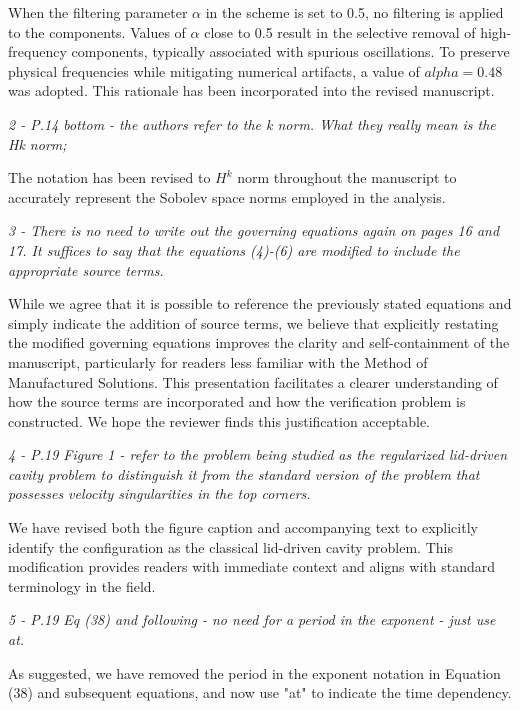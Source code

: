 \documentclass[12pt]{article}
\begin{document}
\vspace{3mm}
When the filtering parameter $\alpha$ in the scheme is set to 0.5, no filtering is applied to the components. Values of $\alpha$ close to 0.5 result in the selective removal of high-frequency components, typically associated with spurious oscillations. To preserve physical frequencies while mitigating numerical artifacts, a value of $alpha = 0.48$ was adopted. This rationale has been incorporated into the revised manuscript.
\vspace{3mm}

{\it 2 - P.14 bottom - the authors refer to the k norm. What they really mean is the Hk norm;}

\vspace{3mm}
The notation has been revised to $H^k$ norm throughout the manuscript to accurately represent the Sobolev space norms employed in the analysis.
\vspace{3mm}

{\it 3 - There is no need to write out the governing equations again on pages 16 and 17. It suffices to say that the equations (4)-(6) are modified to include the appropriate source terms.}

\vspace{3mm}
While we agree that it is possible to reference the previously stated equations and simply indicate the addition of source terms, we believe that explicitly restating the modified governing equations improves the clarity and self-containment of the manuscript, particularly for readers less familiar with the Method of Manufactured Solutions. This presentation facilitates a clearer understanding of how the source terms are incorporated and how the verification problem is constructed. We hope the reviewer finds this justification acceptable.
\vspace{3mm}

{\it 4 - P.19 Figure 1 - refer to the problem being studied as the regularized lid-driven cavity problem to distinguish it from the standard version of the problem that possesses velocity singularities in the top corners.}

\vspace{3mm}
We have revised both the figure caption and accompanying text to explicitly identify the configuration as the classical lid-driven cavity problem. This modification provides readers with immediate context and aligns with standard terminology in the field.
\vspace{3mm}

{\it 5 - P.19 Eq (38) and following - no need for a period in the exponent - just use at.}

\vspace{3mm}
As suggested, we have removed the period in the exponent notation in Equation (38) and subsequent equations, and now use "at" to indicate the time dependency.
\vspace{3mm}

\end{document}
